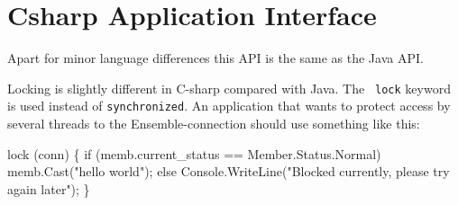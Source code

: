 \section{Csharp Application Interface}
Apart for minor language differences this API is the same as the Java
API. 

Locking is slightly different in C-sharp compared with Java. The {\tt
  lock} keyword is used instead of {\tt synchronized}. An application
that wants to protect access by several threads to the
Ensemble-connection should use something like this: 
\begin{codebox}
  lock (conn) 
  \{
      if (memb.current_status == Member.Status.Normal)
          memb.Cast("hello world");
       else
           Console.WriteLine("Blocked currently, please try again later");
  \}
\end{codebox}

